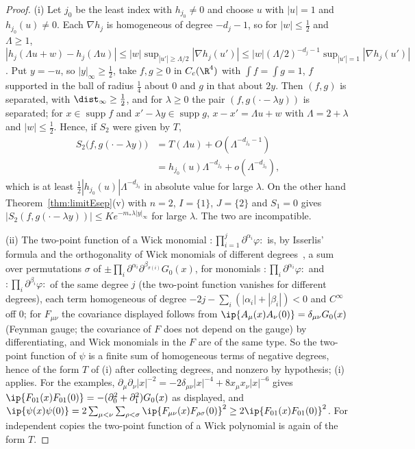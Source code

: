 \begin{proof}
(i) Let $j_0$ be the least index with $h_{j_0}\ne0$ and choose $u$ with $|u|
=1$ and $h_{j_0}(u)\ne0$. Each $\nabla h_j$ is homogeneous of degree $-d_j-1$,
so for $|w|\le\frac12$ and $\Lambda\ge1$, $|h_j(\Lambda u+w)-h_j(\Lambda u)|
\le|w|\sup_{|u'|\ge\Lambda/2}|\nabla h_j(u')|\le|w|(\Lambda/2)^{-d_j-1}
\sup_{|u'|=1}|\nabla h_j(u')|$. Put $y=-u$, so $|y|_\infty\ge\frac12$, take
$f,g\ge0$ in $C_c(\R^4)$ with $\int f=\int g=1$, $f$ supported in the ball of
radius $\frac14$ about $0$ and $g$ in that about $2y$. Then $(f,g)$ is
separated, with $\dist_\infty\ge\frac12$, and for $\lambda\ge0$ the pair
$(f,g(\cdot-\lambda y))$ is separated; for $x\in\operatorname{supp}f$ and
$x'-\lambda y\in\operatorname{supp}g$, $x-x'=\Lambda u+w$ with $\Lambda=
2+\lambda$ and $|w|\le\frac12$. Hence, if $S_2$ were given by $T$,
\[
\begin{split}
S_2\bigl(f,g(\cdot-\lambda y)\bigr)&=T(\Lambda u)+O(\Lambda^{-d_{j_0}-1})\\
&=h_{j_0}(u)\Lambda^{-d_{j_0}}+o(\Lambda^{-d_{j_0}}),
\end{split}
\]
which is at least $\frac12|h_{j_0}(u)|\Lambda^{-d_{j_0}}$ in absolute value
for large $\lambda$. On the other hand Theorem~\ref{thm:limitEsep}(v) with
$n=2$, $I=\{1\}$, $J=\{2\}$ and $S_1=0$ gives $|S_2(f,g(\cdot-\lambda y))|\le
Ke^{-m_*\lambda|y|_\infty}$ for large $\lambda$. The two are incompatible.

(ii) The two-point function of a Wick monomial ${:}\prod_{i=1}^j\partial^{
\alpha_i}\varphi{:}$ is, by Isserlis' formula and the orthogonality of Wick
monomials of different degrees~\cite{Jan97}, a sum over permutations $\sigma$
of $\pm\prod_i\partial^{\alpha_i}\partial^{\beta_{\sigma(i)}}G_0(x)$, for
monomials ${:}\prod_i\partial^{\alpha_i}\varphi{:}$ and ${:}\prod_i
\partial^{\beta_i}\varphi{:}$ of the same degree $j$ \textup{(}the two-point
function vanishes for different degrees\textup{)}, each term homogeneous of
degree $-2j-\sum_i(|\alpha_i|+|\beta_i|)<0$ and $C^\infty$ off $0$;
for $F_{\mu\nu}$ the covariance displayed follows from $\ip{A_\mu(x)A_\nu(0)}
=\delta_{\mu\nu}G_0(x)$ (Feynman gauge; the covariance of $F$ does not depend
on the gauge) by differentiating, and Wick monomials in the $F$ are of the
same type. So the two-point function of $\psi$ is a finite sum of homogeneous
terms of negative degrees, hence of the form $T$ of (i) after collecting
degrees, and nonzero by hypothesis; (i) applies. For the examples,
$\partial_\mu\partial_\nu|x|^{-2}=-2\delta_{\mu\nu}|x|^{-4}+8x_\mu x_\nu|x|^{-6}$
gives $\ip{F_{01}(x)F_{01}(0)}=-(\partial_0^2+\partial_1^2)G_0(x)$ as displayed,
and $\ip{\psi(x)\psi(0)}=2\sum_{\mu<\nu}\sum_{\rho<\sigma}\ip{F_{\mu\nu}(x)
F_{\rho\sigma}(0)}^2\ge2\ip{F_{01}(x)F_{01}(0)}^2$. For independent copies
the two-point function of a Wick polynomial is again of the form $T$.
\end{proof}

